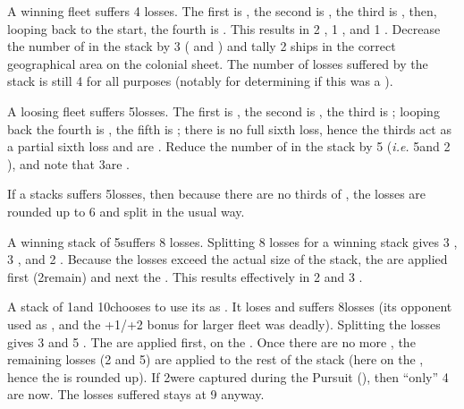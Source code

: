 \begin{exemple}
  A winning fleet suffers 4 losses. The first is , the second
  is , the third is , then, looping back to
  the start, the fourth is . This results in 2 
  \ND, 1 , and 1 . Decrease the number of \ND
  in the stack by 3 ( and ) and tally 2
   ships in the correct geographical area on the colonial
  sheet. The number of losses suffered by the stack is still 4 for all
  purposes (notably for determining if this was a ).

  \smallskip

  A loosing \NWD fleet suffers 5\texttd losses. The first is ,
  the second is , the third is ; looping back
  the fourth is , the fifth is ; there is no
  full sixth loss, hence the thirds act as a partial sixth loss and are
  . Reduce the number of \ND in the stack by 5\texttd
  (\emph{i.e.} 5\ND and 2 \NDE), and note that 3\texttd are .

  \smallskip

  If a \NGD stacks suffers 5\texttu losses, then because there are no
  thirds of \NGD, the losses are rounded up to 6 and split in the usual way.

  \smallskip

  A winning stack of 5\ND suffers 8 losses. Splitting 8 losses for a winning
  stack gives 3 , 3 , and 2
  . Because the losses exceed the actual size of the stack,
  the  are applied first (2\ND remain) and next the
  . This results effectively in 2  and 3
  .

  \smallskip

  A stack of 1\NWD and 10\NGD chooses to use its \NWD as . It loses and suffers 8\texttd losses (its opponent used \NGD as
  , and the +1/+2 bonus for larger fleet was
  deadly). Splitting the losses gives 3  and 5\texttd
  . The  are applied first, on the
  . Once there are no more ,
  the remaining losses (2  and 5\texttd {}) are
  applied to the rest of the stack (here on the \NGD, hence the \texttd is
  rounded up). If 2\NGD were captured during the Pursuit (\textetoile), then
  ``only'' 4 are  now. The losses suffered stays at 9 anyway.
\end{exemple}

